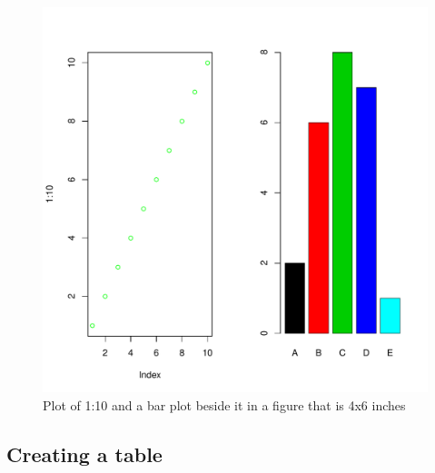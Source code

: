 \begin{figure}
\begin{knitrout}
\color{fgcolor}\begin{kframe}
\begin{alltt}
\hlstd{(}\hlstd{=}\hlstd{(}\hlstd{,}\hlstd{))}
\hlstd{(}\hlopt{:}\hlstd{,} \hlstd{=}\hlstd{,} \hlstd{=}\hlstd{)}
\hlstd{(}\hlstd{=}\hlstd{(}\hlopt{:}\hlstd{,}\hlstd{),} \hlstd{=LETTERS[}\hlopt{:}\hlstd{],} \hlstd{=}\hlopt{:}\hlstd{)}
\end{alltt}
\end{kframe}
\includegraphics[width=\maxwidth]{figure/test3-1} 

\end{knitrout}

\caption{Plot of 1:10 and a bar plot beside it in a figure that is 4x6 inches}

\end{figure}

\newpage
\subsection{Creating a table}

